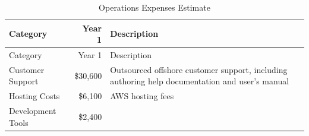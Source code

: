 \documentclass[10pt,openany]{book}
\begin{document}
\begin{longtable}[]{@{}lrl@{}}
\caption{Operations Expenses Estimate}\tabularnewline
\toprule
\begin{minipage}[b]{0.31\columnwidth}\raggedright
Category\strut
\end{minipage} & \begin{minipage}[b]{0.12\columnwidth}\raggedleft
Year 1\strut
\end{minipage} & \begin{minipage}[b]{0.48\columnwidth}\raggedright
Description\strut
\end{minipage}\tabularnewline
\midrule
\endfirsthead
\toprule
\begin{minipage}[b]{0.31\columnwidth}\raggedright
Category\strut
\end{minipage} & \begin{minipage}[b]{0.12\columnwidth}\raggedleft
Year 1\strut
\end{minipage} & \begin{minipage}[b]{0.48\columnwidth}\raggedright
Description\strut
\end{minipage}\tabularnewline
\midrule
\endhead
\begin{minipage}[t]{0.31\columnwidth}\raggedright
Customer Support\strut
\end{minipage} & \begin{minipage}[t]{0.12\columnwidth}\raggedleft
\$30,600\strut
\end{minipage} & \begin{minipage}[t]{0.48\columnwidth}\raggedright
Outsourced offshore customer support, including authoring help
documentation and user's manual\strut
\end{minipage}\tabularnewline
\begin{minipage}[t]{0.31\columnwidth}\raggedright
Hosting Costs\strut
\end{minipage} & \begin{minipage}[t]{0.12\columnwidth}\raggedleft
\$6,100\strut
\end{minipage} & \begin{minipage}[t]{0.48\columnwidth}\raggedright
AWS hosting fees\strut
\end{minipage}\tabularnewline
\begin{minipage}[t]{0.31\columnwidth}\raggedright
Development Tools\strut
\end{minipage} & \begin{minipage}[t]{0.12\columnwidth}\raggedleft
\$2,400\strut
\end{minipage} & \begin{minipage}[t]{0.48\columnwidth}\raggedright

\end{minipage}
\end{longtable}
\end{document}
